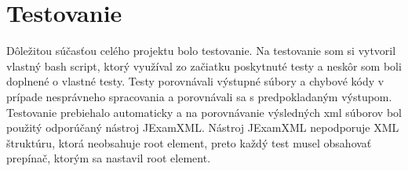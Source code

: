 \documentclass[10pt,a4paper,final]{article}
\begin{document}
  \section{Testovanie} \label{testovanie}

Dôležitou súčasťou celého projektu bolo testovanie. Na testovanie som si vytvoril vlastný bash script, ktorý využíval zo začiatku poskytnuté testy a neskôr som boli doplnené o vlastné testy. Testy porovnávali výstupné súbory a chybové kódy v prípade nesprávneho spracovania a porovnávali sa s predpokladaným výstupom. Testovanie prebiehalo automaticky a na porovnávanie výsledných xml súborov bol použitý odporúčaný nástroj JExamXML. Nástroj JExamXML nepodporuje XML štruktúru, ktorá neobsahuje root element, preto každý test musel obsahovať prepínač, ktorým sa nastavil root element.

    
\end{document}
